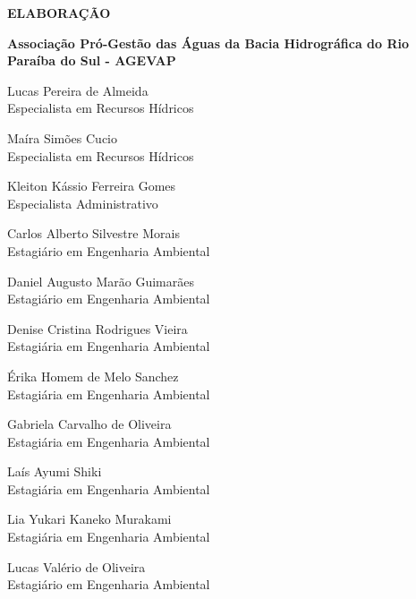 
	\begin{flushleft}
	{\bfseries\Large\MakeUppercase{Elaboração}}\vspace{1.5em}
	
	\textbf{Associação Pró-Gestão das Águas da Bacia Hidrográfica do Rio Paraíba do Sul - AGEVAP}\vspace{1em}

	{Lucas Pereira de Almeida\\
 	 Especialista em Recursos Hídricos}\vspace{1em}

	{Maíra Simões Cucio\\
	Especialista em Recursos Hídricos}\vspace{1em}

	{Kleiton Kássio Ferreira Gomes\\
	Especialista Administrativo}\vspace{1em} 

	{Carlos Alberto Silvestre Morais\\
	Estagiário em Engenharia Ambiental}\vspace{1em}
	
	{Daniel Augusto Marão Guimarães\\
    Estagiário em Engenharia Ambiental}\vspace{1em}
	
	{Denise Cristina Rodrigues Vieira\\
	Estagiária em Engenharia Ambiental}\vspace{1em}
	
	{Érika Homem de Melo Sanchez\\
	Estagiária em Engenharia Ambiental}\vspace{1em}
	
	{Gabriela Carvalho de Oliveira\\
	Estagiária em Engenharia Ambiental}\vspace{1em}

	{Laís Ayumi Shiki\\
	Estagiária em Engenharia Ambiental}\vspace{1em}
	
	{Lia Yukari Kaneko Murakami\\
	Estagiária em Engenharia Ambiental}\vspace{1em}
	
	{Lucas Valério de Oliveira\\
	Estagiário em Engenharia Ambiental}\vspace{1em}


\end{flushleft}
